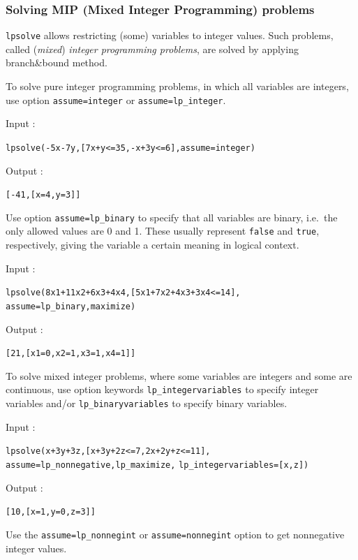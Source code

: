 \documentclass[a4paper,11pt]{book}
\begin{document}
\subsubsection{Solving MIP (Mixed Integer Programming) problems}
{\tt lpsolve} allows restricting (some) variables to integer values. Such problems, called (\emph{mixed}) \emph{integer programming problems}, are solved by applying branch\&bound method.

To solve pure integer programming problems, in which all variables are integers, use option {\tt assume=integer} or {\tt assume=lp\_integer}.

\noindent Input :
\begin{center}
{\tt lpsolve(-5x-7y,[7x+y<=35,-x+3y<=6],assume=integer)}
\end{center}
Output :
\begin{center}
{\tt [-41,[x=4,y=3]]}
\end{center}

Use option {\tt assume=lp\_binary} to specify that all variables are binary, i.e.~the only allowed values are 0 and 1. These usually represent {\tt false} and {\tt true}, respectively, giving the variable a certain meaning in logical context.

\noindent Input :
\begin{center}
{\tt lpsolve(8x1+11x2+6x3+4x4,[5x1+7x2+4x3+3x4<=14],}\\
{\tt assume=lp\_binary,maximize)}
\end{center}
Output :
\begin{center}
{\tt [21,[x1=0,x2=1,x3=1,x4=1]]}
\end{center}

To solve mixed integer problems, where some variables are integers and some are continuous, use option keywords {\tt lp\_integervariables} to specify integer variables and/or {\tt lp\_binaryvariables} to specify binary variables.

\noindent Input :
\begin{center}
{\tt lpsolve(x+3y+3z,[x+3y+2z<=7,2x+2y+z<=11],}\\
{\tt assume=lp\_nonnegative,lp\_maximize,}
{\tt lp\_integervariables=[x,z])}
\end{center}
Output :
\begin{center}
	\tt [10,[x=1,y=0,z=3]]
\end{center}

Use the {\tt assume=lp\_nonnegint} or {\tt assume=nonnegint} option to get nonnegative integer values.
\end{document}
